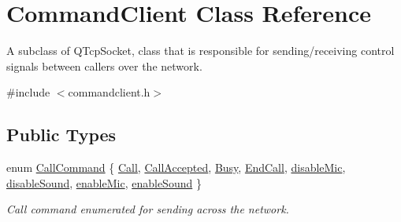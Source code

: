 \hypertarget{class_command_client}{
\section{\-Command\-Client \-Class \-Reference}
\label{class_command_client}
}


\-A subclass of \-Q\-Tcp\-Socket, class that is responsible for sending/receiving control signals between callers over the network.  




{\ttfamily \#include $<$commandclient.\-h$>$}

\subsection*{\-Public \-Types}
\begin{DoxyCompactItemize}
\item 
enum \hyperlink{class_command_client_aa99b17193724fef8aed2b2c724b0c243}{\-Call\-Command} \{ \*
\hyperlink{class_command_client_aa99b17193724fef8aed2b2c724b0c243adb48663cf07267a4bd93fc62a19d5a1b}{\-Call}, 
\hyperlink{class_command_client_aa99b17193724fef8aed2b2c724b0c243afee233a7e84c51b2f49454f28ee45f57}{\-Call\-Accepted}, 
\hyperlink{class_command_client_aa99b17193724fef8aed2b2c724b0c243abf63b268b2f2d99a0b1dd62ef12203b1}{\-Busy}, 
\hyperlink{class_command_client_aa99b17193724fef8aed2b2c724b0c243abe934ba3c4b37aec4c163fc89a87a9e4}{\-End\-Call}, 
\*
\hyperlink{class_command_client_aa99b17193724fef8aed2b2c724b0c243ad46068afac5c51ce9be6bf83b41dfffb}{disable\-Mic}, 
\hyperlink{class_command_client_aa99b17193724fef8aed2b2c724b0c243af82ae32aca1e073b23e4e9fadfc646ae}{disable\-Sound}, 
\hyperlink{class_command_client_aa99b17193724fef8aed2b2c724b0c243aa61a9809208f36eee6d6af26cf30a4ba}{enable\-Mic}, 
\hyperlink{class_command_client_aa99b17193724fef8aed2b2c724b0c243a7eb7f05fc849c5e6a03cec51912a5d84}{enable\-Sound}
 \}
\begin{DoxyCompactList}\small\item\em \-Call command enumerated for sending across the network. \end{DoxyCompactList}\end{DoxyCompactItemize}
